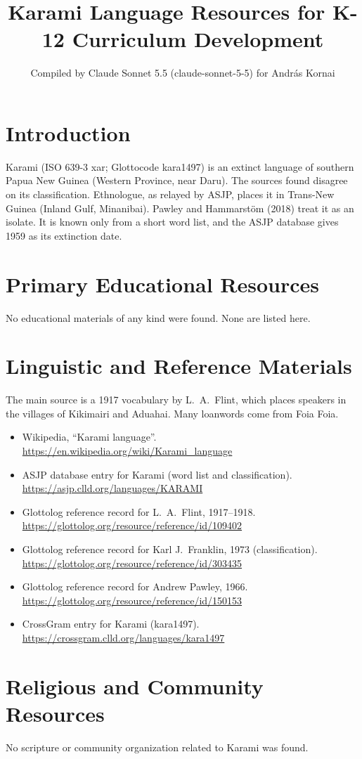\documentclass[12pt]{article}
\title{Karami Language Resources for K-12 Curriculum Development}
\author{Compiled by Claude Sonnet 5.5 (claude-sonnet-5-5) for Andr\'as Kornai}
\date{}
\begin{document}
\maketitle

\section{Introduction}
Karami (ISO 639-3 xar; Glottocode kara1497) is an extinct language of southern Papua New Guinea (Western Province, near Daru). The sources found disagree on its classification. Ethnologue, as relayed by ASJP, places it in Trans-New Guinea (Inland Gulf, Minanibai). Pawley and Hammarst\"om (2018) treat it as an isolate. It is known only from a short word list, and the ASJP database gives 1959 as its extinction date.

\section{Primary Educational Resources}
No educational materials of any kind were found. None are listed here.

\section{Linguistic and Reference Materials}
The main source is a 1917 vocabulary by L.\ A.\ Flint, which places speakers in the villages of Kikimairi and Aduahai. Many loanwords come from Foia Foia.
\begin{itemize}
\item Wikipedia, ``Karami language''. \url{https://en.wikipedia.org/wiki/Karami_language}
\item ASJP database entry for Karami (word list and classification). \url{https://asjp.clld.org/languages/KARAMI}
\item Glottolog reference record for L.\ A.\ Flint, 1917--1918. \url{https://glottolog.org/resource/reference/id/109402}
\item Glottolog reference record for Karl J.\ Franklin, 1973 (classification). \url{https://glottolog.org/resource/reference/id/303435}
\item Glottolog reference record for Andrew Pawley, 1966. \url{https://glottolog.org/resource/reference/id/150153}
\item CrossGram entry for Karami (kara1497). \url{https://crossgram.clld.org/languages/kara1497}
\end{itemize}

\section{Religious and Community Resources}
No scripture or community organization related to Karami was found.
\end{document}
